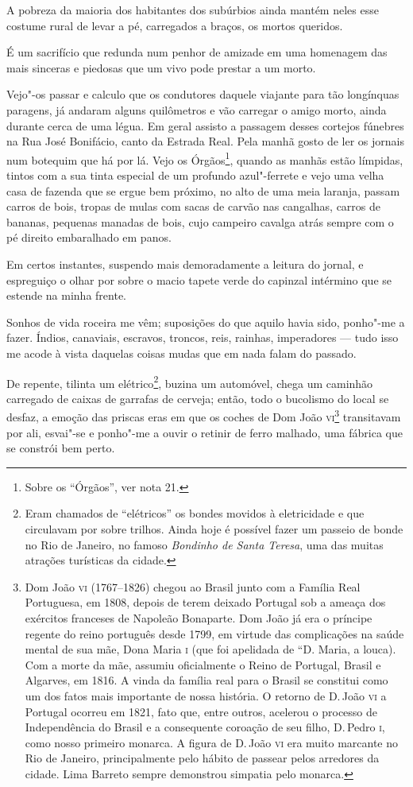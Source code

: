 A pobreza da maioria dos habitantes dos subúrbios ainda mantém neles
esse costume rural de levar a pé, carregados a braços, os mortos
queridos.

É um sacrifício que redunda num penhor de amizade em uma homenagem das
mais sinceras e piedosas que um vivo pode prestar a um morto.

Vejo"-os passar e calculo que os condutores daquele viajante para tão
longínquas paragens, já andaram alguns quilômetros e vão carregar o
amigo morto, ainda durante cerca de uma légua. Em geral assisto a
passagem desses cortejos fúnebres na Rua José Bonifácio, canto da
Estrada Real. Pela manhã gosto de ler os jornais num botequim que há por
lá. Vejo os Órgãos\footnote{Sobre os ``Órgãos'', ver nota 21.}, quando
as manhãs estão límpidas, tintos com a sua tinta especial de um profundo
azul"-ferrete e vejo uma velha casa de fazenda que se ergue bem próximo,
no alto de uma meia laranja, passam carros de bois, tropas de mulas com
sacas de carvão nas cangalhas, carros de bananas, pequenas manadas de
bois, cujo campeiro cavalga atrás sempre com o pé direito embaralhado em
panos.

Em certos instantes, suspendo mais demoradamente a leitura do jornal, e
espreguiço o olhar por sobre o macio tapete verde do capinzal intérmino
que se estende na minha frente.

Sonhos de vida roceira me vêm; suposições do que aquilo havia sido,
ponho"-me a fazer. Índios, canaviais, escravos, troncos, reis, rainhas,
imperadores --- tudo isso me acode à vista daquelas coisas mudas que em
nada falam do passado.

De repente, tilinta um elétrico\footnote{Eram chamados de ``elétricos''
  os bondes movidos à eletricidade e que circulavam por sobre trilhos.
  Ainda hoje é possível fazer um passeio de bonde no Rio de Janeiro, no
  famoso \emph{Bondinho de Santa Teresa}, uma das muitas atrações
  turísticas da cidade.}, buzina um automóvel, chega um caminhão
carregado de caixas de garrafas de cerveja; então, todo o bucolismo do
local se desfaz, a emoção das priscas eras em que os coches de Dom João
\textsc{vi}\footnote{Dom João \textsc{vi} (1767--1826) chegou ao Brasil junto com a
  Família Real Portuguesa, em 1808, depois de terem deixado Portugal sob
  a ameaça dos exércitos franceses de Napoleão Bonaparte. Dom João já
  era o príncipe regente do reino português desde 1799, em virtude das
  complicações na saúde mental de sua mãe, Dona Maria \textsc{i} (que foi
  apelidada de ``D. Maria, a louca). Com a morte da mãe, assumiu
  oficialmente o Reino de Portugal, Brasil e Algarves, em 1816. A vinda
  da família real para o Brasil se constitui como um dos fatos mais
  importante de nossa história. O retorno de D.\,João \textsc{vi} a Portugal
  ocorreu em 1821, fato que, entre outros, acelerou o processo de
  Independência do Brasil e a consequente coroação de seu filho, D.\,Pedro \textsc{i}, como nosso primeiro monarca. A figura de D.\,João \textsc{vi} era muito
  marcante no Rio de Janeiro, principalmente pelo hábito de passear
  pelos arredores da cidade. Lima Barreto sempre demonstrou simpatia
  pelo monarca.} transitavam por ali, esvai"-se e ponho"-me a ouvir o
retinir de ferro malhado, uma fábrica que se constrói bem perto.

